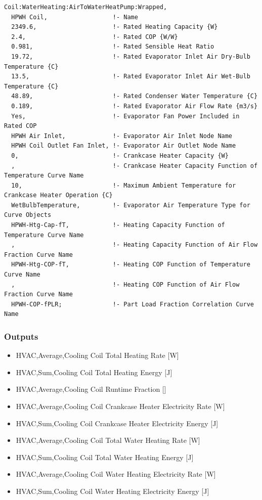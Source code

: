 \begin{lstlisting}
Coil:WaterHeating:AirToWaterHeatPump:Wrapped,
  HPWH Coil,                  !- Name
  2349.6,                     !- Rated Heating Capacity {W}
  2.4,                        !- Rated COP {W/W}
  0.981,                      !- Rated Sensible Heat Ratio
  19.72,                      !- Rated Evaporator Inlet Air Dry-Bulb Temperature {C}
  13.5,                       !- Rated Evaporator Inlet Air Wet-Bulb Temperature {C}
  48.89,                      !- Rated Condenser Water Temperature {C}
  0.189,                      !- Rated Evaporator Air Flow Rate {m3/s}
  Yes,                        !- Evaporator Fan Power Included in Rated COP
  HPWH Air Inlet,             !- Evaporator Air Inlet Node Name
  HPWH Coil Outlet Fan Inlet, !- Evaporator Air Outlet Node Name
  0,                          !- Crankcase Heater Capacity {W}
  ,                           !- Crankcase Heater Capacity Function of Temperature Curve Name
  10,                         !- Maximum Ambient Temperature for Crankcase Heater Operation {C}
  WetBulbTemperature,         !- Evaporator Air Temperature Type for Curve Objects
  HPWH-Htg-Cap-fT,            !- Heating Capacity Function of Temperature Curve Name
  ,                           !- Heating Capacity Function of Air Flow Fraction Curve Name
  HPWH-Htg-COP-fT,            !- Heating COP Function of Temperature Curve Name
  ,                           !- Heating COP Function of Air Flow Fraction Curve Name
  HPWH-COP-fPLR;              !- Part Load Fraction Correlation Curve Name
\end{lstlisting}

\subsubsection{Outputs}\label{outputs-24}

\begin{itemize}
\item
  HVAC,Average,Cooling Coil Total Heating Rate {[}W{]}
\item
  HVAC,Sum,Cooling Coil Total Heating Energy {[}J{]}
\item
  HVAC,Average,Cooling Coil Runtime Fraction {[]}
\item
  HVAC,Average,Cooling Coil Crankcase Heater Electricity Rate {[}W{]}
\item
  HVAC,Sum,Cooling Coil Crankcase Heater Electricity Energy {[}J{]}
\item
  HVAC,Average,Cooling Coil Total Water Heating Rate {[}W{]}
\item
  HVAC,Sum,Cooling Coil Total Water Heating Energy {[}J{]}
\item
  HVAC,Average,Cooling Coil Water Heating Electricity Rate {[}W{]}
\item
  HVAC,Sum,Cooling Coil Water Heating Electricity Energy {[}J{]}
\end{itemize}

